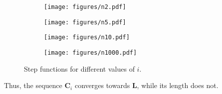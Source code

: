 \documentclass{scrartcl}
\begin{document}
\begin{figure}[h]
	\centering
	\begin{subfigure}{0.49\textwidth}
	\texttt{[image: figures/n2.pdf]}
	\end{subfigure}
	\begin{subfigure}{0.49\textwidth}
	\texttt{[image: figures/n5.pdf]}
	\end{subfigure}
	\begin{subfigure}{0.49\textwidth}
	\texttt{[image: figures/n10.pdf]}
	\end{subfigure}
	\begin{subfigure}{0.49\textwidth}
	\texttt{[image: figures/n1000.pdf]}
	\end{subfigure}
	\caption{Step functions for different values of $i$.}
	\label{fig:steps}
\end{figure}

Thus, the sequence $\mathbf{C}_i$ converges towards $\mathbf{L}$, while its length does not.

	
\end{document}
